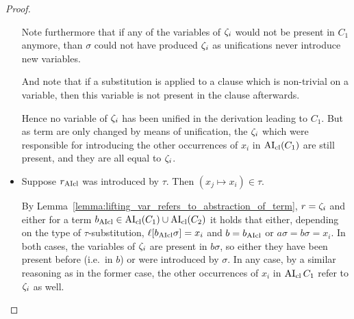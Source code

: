\documentclass[,%
	paper=a4,%
	DIV14, 
	liststotoc,
	bibtotoc,
	draft=false,%
	numbers=noendperiod
]{scrartcl}
\begin{document}
\begin{proof}
\begin{itemize}
				Note furthermore that if any of the variables of $\zeta_{i}$ would not be present in $C_1$ anymore, than $\sigma$ could not have produced $\zeta_{i}$ as unifications never introduce new variables.

				And note that if a substitution is applied to a clause which is non-trivial on a variable, then this variable is not present in the clause afterwards.

				Hence no variable of $\zeta_{i}$ has been unified in the derivation leading to $C_1$. But as term are only changed by means of unification, the $\zeta_{i}$ which were responsible for introducing the other occurrences of $x_i$ in $\operatorname{AI}_\mathrm{cl}(C_1)$ are still present, and they are all equal to $\zeta_{i}$.

			\item Suppose $r_{\operatorname{AIcl}}$ was introduced by $\tau$.
				Then $(x_j \mapsto x_i) \in \tau$.

				By Lemma~\ref{lemma:lifting_var_refers_to_abstraction_of_term}, $r = \zeta_{i}$ and either for a term $b_{\operatorname{AIcl}}\in\operatorname{AI}_\mathrm{cl}(C_1)\cup\operatorname{AI}_\mathrm{cl}(C_2)$ it holds that either, depending on the type of $\tau$-substitution, $\ell[b_{\operatorname{AIcl}}\sigma] = x_i$ and $b=b_{\operatorname{AIcl}}$ or $a\sigma = b\sigma = x_i$.
				In both cases, the variables of $\zeta_{i}$ are present in $b\sigma$, so either they have been present before (i.e.\ in $b$) or were introduced by $\sigma$. In any case, by a similar reasoning as in the former case, the other occurrences of $x_i$ in $\operatorname{AI}_\mathrm{cl}{C_1}$ refer to $\zeta_{i}$ as well. 
				\qedhere
		\end{itemize}
	\end{proof}
\end{document}
